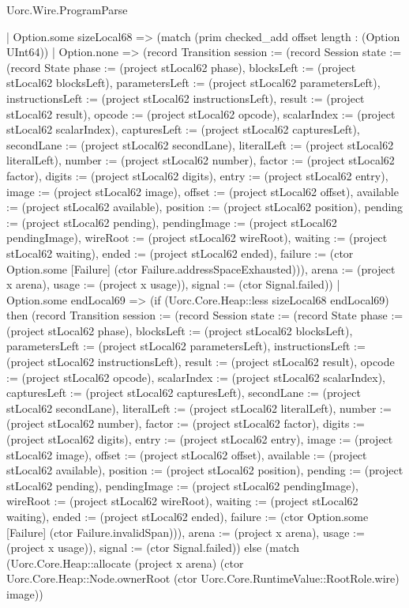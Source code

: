 \begin{lexlean}{Uorc.Wire.ProgramParse}
\begin{semanticmodule}
{          | Option.some sizeLocal68 => (match (prim checked_add offset length : (Option UInt64))
            | Option.none => (record Transition {session := (record Session {state := (record State {phase := (project stLocal62 phase), blocksLeft := (project stLocal62 blocksLeft), parametersLeft := (project stLocal62 parametersLeft), instructionsLeft := (project stLocal62 instructionsLeft), result := (project stLocal62 result), opcode := (project stLocal62 opcode), scalarIndex := (project stLocal62 scalarIndex), capturesLeft := (project stLocal62 capturesLeft), secondLane := (project stLocal62 secondLane), literalLeft := (project stLocal62 literalLeft), number := (project stLocal62 number), factor := (project stLocal62 factor), digits := (project stLocal62 digits), entry := (project stLocal62 entry), image := (project stLocal62 image), offset := (project stLocal62 offset), available := (project stLocal62 available), position := (project stLocal62 position), pending := (project stLocal62 pending), pendingImage := (project stLocal62 pendingImage), wireRoot := (project stLocal62 wireRoot), waiting := (project stLocal62 waiting), ended := (project stLocal62 ended), failure := (ctor Option.some [Failure] (ctor Failure.addressSpaceExhausted))}), arena := (project x arena), usage := (project x usage)}), signal := (ctor Signal.failed)})
            | Option.some endLocal69 => (if (Uorc.Core.Heap::less sizeLocal68 endLocal69) then (record Transition {session := (record Session {state := (record State {phase := (project stLocal62 phase), blocksLeft := (project stLocal62 blocksLeft), parametersLeft := (project stLocal62 parametersLeft), instructionsLeft := (project stLocal62 instructionsLeft), result := (project stLocal62 result), opcode := (project stLocal62 opcode), scalarIndex := (project stLocal62 scalarIndex), capturesLeft := (project stLocal62 capturesLeft), secondLane := (project stLocal62 secondLane), literalLeft := (project stLocal62 literalLeft), number := (project stLocal62 number), factor := (project stLocal62 factor), digits := (project stLocal62 digits), entry := (project stLocal62 entry), image := (project stLocal62 image), offset := (project stLocal62 offset), available := (project stLocal62 available), position := (project stLocal62 position), pending := (project stLocal62 pending), pendingImage := (project stLocal62 pendingImage), wireRoot := (project stLocal62 wireRoot), waiting := (project stLocal62 waiting), ended := (project stLocal62 ended), failure := (ctor Option.some [Failure] (ctor Failure.invalidSpan))}), arena := (project x arena), usage := (project x usage)}), signal := (ctor Signal.failed)}) else (match (Uorc.Core.Heap::allocate (project x arena) (ctor Uorc.Core.Heap::Node.ownerRoot (ctor Uorc.Core.RuntimeValue::RootRole.wire) image))
}
\end{semanticmodule}
\end{lexlean}
